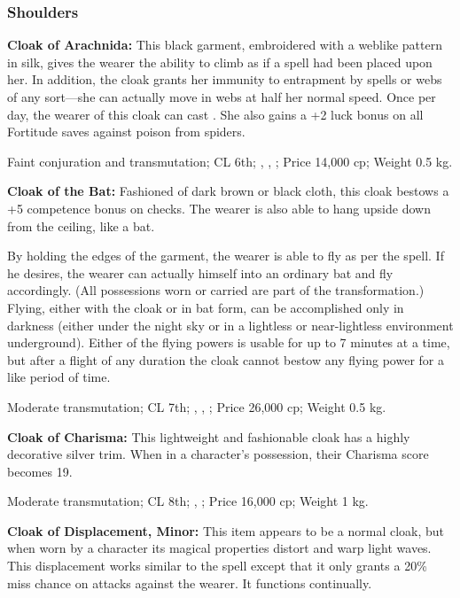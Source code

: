 \subsubsection{Shoulders}

\textbf{Cloak of Arachnida:} This black garment, embroidered with a weblike pattern in silk, gives the wearer the ability to climb as if a  spell had been placed upon her. In addition, the cloak grants her immunity to entrapment by  spells or webs of any sort---she can actually move in webs at half her normal speed. Once per day, the wearer of this cloak can cast . She also gains a +2 luck bonus on all Fortitude saves against poison from spiders.

Faint conjuration and transmutation; CL 6th; , , ; Price 14,000 cp; Weight 0.5 kg.


\textbf{Cloak of the Bat:} Fashioned of dark brown or black cloth, this cloak bestows a +5 competence bonus on  checks. The wearer is also able to hang upside down from the ceiling, like a bat.

By holding the edges of the garment, the wearer is able to fly as per the spell. If he desires, the wearer can actually  himself into an ordinary bat and fly accordingly. (All possessions worn or carried are part of the transformation.) Flying, either with the cloak or in bat form, can be accomplished only in darkness (either under the night sky or in a lightless or near-lightless environment underground). Either of the flying powers is usable for up to 7 minutes at a time, but after a flight of any duration the cloak cannot bestow any flying power for a like period of time.

Moderate transmutation; CL 7th; , , ; Price 26,000 cp; Weight 0.5 kg.


\textbf{Cloak of Charisma:} This lightweight and fashionable cloak has a highly decorative silver trim. When in a character's possession, their Charisma score becomes 19.

Moderate transmutation; CL 8th; , ; Price 16,000 cp; Weight 1 kg.


\textbf{Cloak of Displacement, Minor:} This item appears to be a normal cloak, but when worn by a character its magical properties distort and warp light waves. This displacement works similar to the  spell except that it only grants a 20\% miss chance on attacks against the wearer. It functions continually.

